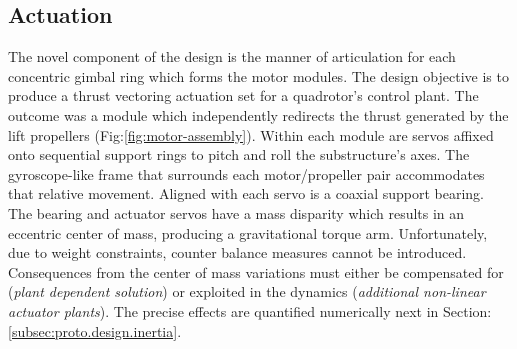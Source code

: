 \subsection{Actuation}
\label{subsec:proto.design.actuation}
The novel component of the design is the manner of articulation for each concentric gimbal ring which forms the motor modules. The design objective is to produce a thrust vectoring actuation set for a quadrotor's control plant. The outcome was a module which independently redirects the thrust generated by the lift propellers (Fig:\ref{fig:motor-assembly}). Within each module are servos affixed onto sequential support rings to pitch and roll the substructure's axes. The gyroscope-like frame that surrounds each motor/propeller pair accommodates that relative movement. Aligned with each servo is a coaxial support bearing. The bearing and actuator servos have a mass disparity which results in an eccentric center of mass, producing a gravitational torque arm. Unfortunately, due to weight constraints, counter balance measures cannot be introduced. Consequences from the center of mass variations must either be compensated for (\emph{plant dependent solution}) or exploited in the dynamics (\emph{additional non-linear actuator plants}). The precise effects are quantified numerically next in Section:\ref{subsec:proto.design.inertia}.
\par
